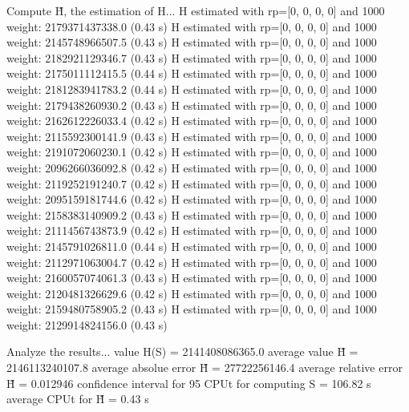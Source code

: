 Compute H̃, the estimation of H...
  H estimated with rp=[0, 0, 0, 0] and 1000 weight:  2179371437338.0  (0.43 s)
  H estimated with rp=[0, 0, 0, 0] and 1000 weight:  2145748966507.5  (0.43 s)
  H estimated with rp=[0, 0, 0, 0] and 1000 weight:  2182921129346.7  (0.43 s)
  H estimated with rp=[0, 0, 0, 0] and 1000 weight:  2175011112415.5  (0.44 s)
  H estimated with rp=[0, 0, 0, 0] and 1000 weight:  2181283941783.2  (0.44 s)
  H estimated with rp=[0, 0, 0, 0] and 1000 weight:  2179438260930.2  (0.43 s)
  H estimated with rp=[0, 0, 0, 0] and 1000 weight:  2162612226033.4  (0.42 s)
  H estimated with rp=[0, 0, 0, 0] and 1000 weight:  2115592300141.9  (0.43 s)
  H estimated with rp=[0, 0, 0, 0] and 1000 weight:  2191072060230.1  (0.42 s)
  H estimated with rp=[0, 0, 0, 0] and 1000 weight:  2096266036092.8  (0.42 s)
  H estimated with rp=[0, 0, 0, 0] and 1000 weight:  2119252191240.7  (0.42 s)
  H estimated with rp=[0, 0, 0, 0] and 1000 weight:  2095159181744.6  (0.42 s)
  H estimated with rp=[0, 0, 0, 0] and 1000 weight:  2158383140909.2  (0.43 s)
  H estimated with rp=[0, 0, 0, 0] and 1000 weight:  2111456743873.9  (0.42 s)
  H estimated with rp=[0, 0, 0, 0] and 1000 weight:  2145791026811.0  (0.44 s)
  H estimated with rp=[0, 0, 0, 0] and 1000 weight:  2112971063004.7  (0.42 s)
  H estimated with rp=[0, 0, 0, 0] and 1000 weight:  2160057074061.3  (0.43 s)
  H estimated with rp=[0, 0, 0, 0] and 1000 weight:  2120481326629.6  (0.42 s)
  H estimated with rp=[0, 0, 0, 0] and 1000 weight:  2159480758905.2  (0.43 s)
  H estimated with rp=[0, 0, 0, 0] and 1000 weight:  2129914824156.0  (0.43 s)

Analyze the results...
  value H(S)                  = 2141408086365.0 
  average value H̃             = 2146113240107.8 
  average absolue error H̃     = 27722256146.4 
  average relative error H̃    = 0.012946 
  confidence interval for 95%
  CPUt for computing S         = 106.82 s
  average CPUt for H̃           = 0.43 s

